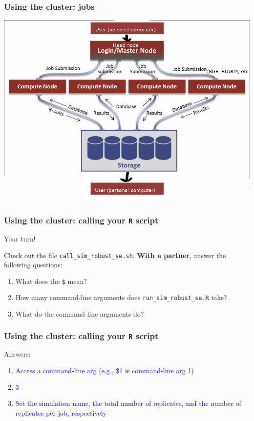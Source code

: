 \documentclass[12pt, 
hyperref={colorlinks=true, linkcolor=BlueViolet, urlcolor=BlueViolet},dvipsnames]{beamer}
\begin{document}
\begin{frame}
\frametitle{Using the cluster: jobs}
\begin{center}
\includegraphics[width = 1\textwidth]{plots/hpc_system.png}
\end{center}
\end{frame}

\begin{frame}
\frametitle{Using the cluster: calling your \texttt{R} script}

Your turn!

Check out the file \texttt{call\_sim\_robust\_se.sh}. \textbf{With a partner}, answer the following questions: \vspace{-0.3cm}
\begin{enumerate}
\item What does the \texttt{\$} mean? 
\item How many command-line arguments does \texttt{run\_sim\_robust\_se.R} take?
\item What do the command-line arguments do?
\end{enumerate}
\end{frame}

\begin{frame}
\frametitle{Using the cluster: calling your \texttt{R} script}

Answers: \vspace{-0.3cm}
\begin{enumerate}
\item \textcolor{blue}{Access a command-line arg (e.g., \$1 is command-line arg 1)}
\item \textcolor{blue}{3}
\item \textcolor{blue}{Set the simulation name, the total number of replicates, and the number of replicates per job, respectively}
\end{enumerate}
\end{frame}
\end{document}
